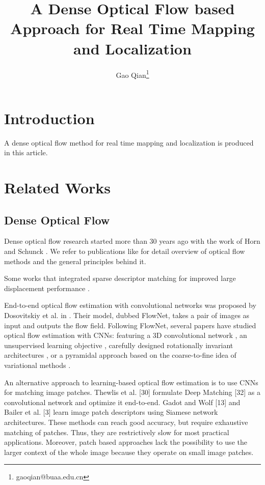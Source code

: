 \documentclass{article}
\title { A Dense Optical Flow based Approach for Real Time Mapping and Localization }
\author{   }
\author{Gao Qian\thanks{gaoqian@buaa.edu.cn}}
\affil{Department of Computer Science, BUAA University}
\begin{document}
\maketitle

\begin{abstract}
\end{abstract}

\section{Introduction}
A dense optical flow method for real time mapping and localization is produced in this article.

\section{Related Works}
\subsection{Dense Optical Flow}
Dense optical flow research started more than 30 years ago with the work of Horn and Schunck \cite{Horn1981Determining}. We refer to publications like \cite{Baker2007A} \cite{Sun2010Secrets} \cite{Vogel2013An} for detail overview of optical flow methods and the general principles behind it.\par

Some works that integrated sparse descriptor matching for improved large displacement performance \cite{Brox2011Large} \cite{Xu2012Motion} \cite{Weinzaepfel2014DeepFlow} \cite{Kennedy2015Optical} \cite{Timofte2015Sparse}.\par

End-to-end optical flow estimation with convolutional networks was proposed by Dosovitskiy et al. in \cite{Dosovitskiy2015FlowNet}. Their model, dubbed FlowNet, takes a pair of images as input and outputs the flow field. Following FlowNet, several papers have studied optical flow estimation with CNNs: featuring a 3D convolutional network \cite{Du2015Deep}, an unsupervised learning objective \cite{Ahmadi2016Unsupervised} \cite{Yu2016Back}, carefully designed rotationally invariant architectures \cite{Teney2016Learning}, or a pyramidal approach based on the coarse-to-fine idea of variational methods \cite{Ranjan2017Optical}.\par

An alternative approach to learning-based optical flow estimation is to use CNNs for matching image patches. Thewlis et al. [30] formulate Deep Matching [32] as a convolutional network and optimize it end-to-end. Gadot and Wolf [13] and Bailer et al. [3] learn image patch descriptors using Siamese network architectures. These methods can reach good accuracy, but require exhaustive matching of patches. Thus, they are restrictively slow for most practical applications. Moreover, patch based approaches lack the possibility to use the larger context of the whole image because they operate on small image patches.
\end{document}
